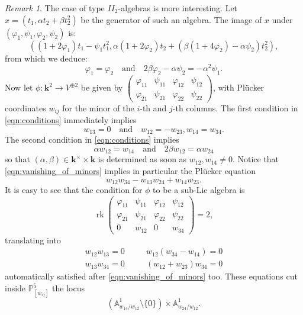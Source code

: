 \documentclass{compositio}
\newcommand{\PP}{\mathbb P}
\renewcommand{\k}{\mathbf k}
\renewcommand{\to}{\rightarrow}
\newcommand{\Aaff}{\mathbb A}
\theoremstyle{plain}
\theoremstyle{definition}
\theoremstyle{remark}
\newtheorem{rem}[thm]{Remark}
\begin{document}
\begin{rem}
 The case of type $I\!I_2$-algebras is more interesting. Let $x=(t_1,\alpha t_2+\beta t_2^2)$ be the generator of such an algebra. The image of $x$ under $(\varphi_1,\psi_1,\varphi_2,\psi_2)$ is:
 \[\left((1+2\varphi_1)t_1-\psi_1t_1^2,\alpha(1+2\varphi_2)t_2+(\beta(1+4\varphi_2)-\alpha\psi_2)t_2^2\right),\]
 from which we deduce:
 \begin{equation}\label{eqn:conditions}
 \varphi_1=\varphi_2\quad\text{and}\quad 2\beta\varphi_2-\alpha\psi_2=-\alpha^2\psi_1.
 \end{equation}
 Now let $\phi\colon\k^2\to V^{\oplus 2}$ be given by $\begin{pmatrix} \varphi_{11} & \psi_{11} & \varphi_{12} & \psi_{12} \\ \varphi_{21} & \psi_{21} & \varphi_{22} & \psi_{22}\end{pmatrix}$, with Pl\"ucker coordinates $w_{ij}$ for the minor of the $i$-th and $j$-th columns. The first condition in \eqref{eqn:conditions} immediately implies 
 \begin{equation}\label{eqn:vanishing_of_minors}
  w_{13}=0\quad\text{and}\quad w_{12}=-w_{23},w_{14}=w_{34}.
 \end{equation}
 The second condition in \eqref{eqn:conditions} implies
 \begin{equation}\label{eqn:nonvan_of_minors}
  \alpha w_{12}=w_{14}\quad\text{and}\quad 2\beta w_{12}=\alpha w_{24}
  \end{equation}
 so that $(\alpha,\beta)\in\k^\times\times\k$ is determined as soon as $w_{12},w_{14}\neq 0$. Notice that \eqref{eqn:vanishing_of_minors} implies in particular the Pl\"ucker equation \[w_{12}w_{34}-w_{13}w_{24}+w_{14}w_{23}.\]
 It is easy to see that the condition for $\phi$ to be a sub-Lie algebra is
 \[\operatorname{rk}\begin{pmatrix} \varphi_{11} & \psi_{11} & \varphi_{12} & \psi_{12} \\ \varphi_{21} & \psi_{21} & \varphi_{22} & \psi_{22} \\ 0 & w_{12} & 0 & w_{34} \end{pmatrix}=2,\]
 translating into 
 \begin{align*}
  w_{12}w_{13}=0 & \quad & w_{12}(w_{34}-w_{14})=0 \\ w_{13}w_{34}=0 & \quad & (w_{12}+w_{23})w_{34}=0
 \end{align*}
 automatically satisfied after \eqref{eqn:vanishing_of_minors} too. These equations cut inside $\PP^5_{[w_{ij}]}$ the locus \[(\Aaff^1_{{w_{14}}/{w_{12}}}\setminus\{0\})\times\Aaff^1_{{w_{24}}/{w_{12}}}.\]

\end{rem}
\end{document}
